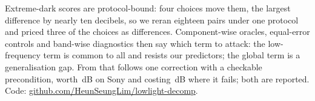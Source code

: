 Extreme-dark scores are protocol-bound: four choices move them, the largest difference by nearly ten decibels,
so we reran eighteen pairs under one protocol and priced three of the choices as differences. Component-wise
oracles, equal-error controls and band-wise diagnostics then say which term to attack: the
low-frequency term is common to all and resists our predictors; the global term is a generalisation
gap. From that follows one correction with a checkable precondition, worth \nFRetgain{}\,dB on Sony
and costing \nLOLRFloss{}\,dB where it fails; both are reported.
Code: \url{github.com/HeunSeungLim/lowlight-decomp}.

